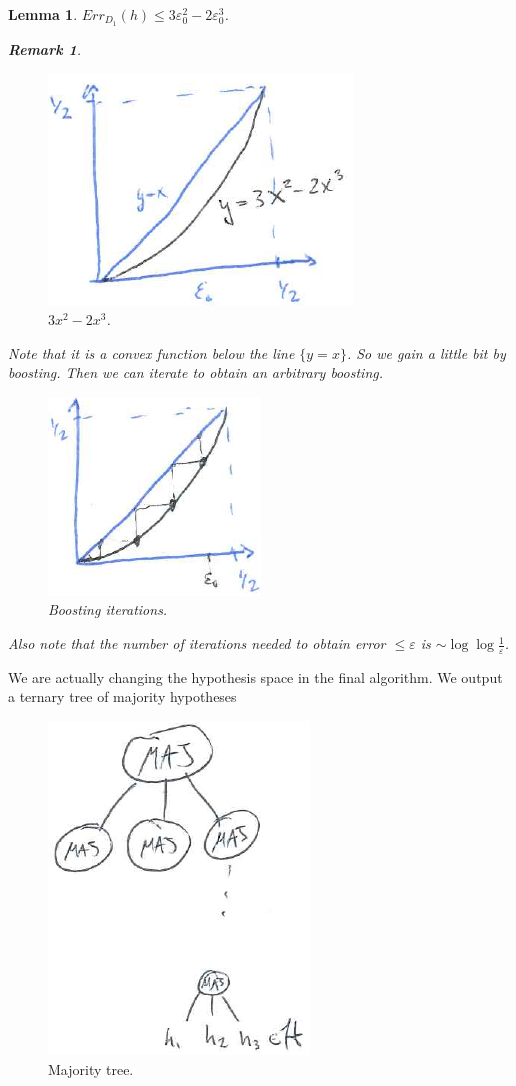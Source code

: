 \documentclass[12pt, letterpaper]{article}
\numberwithin{equation}{section} %
\newcommand{\ve}{\varepsilon}
\newtheorem{lemma}[theorem]{Lemma}
\newtheorem{remark}[theorem]{Remark}
\theoremstyle{definition}
\theoremstyle{remark}
\begin{document}
\begin{lemma}
$Err_{D_1}(h) \leq 3\ve_0^2 - 2\ve_0^3$.
\begin{remark}
\begin{figure}[H]
\centering
\includegraphics[width=0.3\linewidth]{../img/boosting-bound.png}
\caption{$3x^2 - 2x^3$.}
\end{figure}
Note that it is a convex function below the line $\lbrace y = x\rbrace$. So we gain a little bit by boosting. Then we can iterate to obtain an arbitrary boosting.
\begin{figure}[H]
\centering
\includegraphics[width=0.3\linewidth]{../img/boosting-iteration.png}
\caption{Boosting iterations.}
\end{figure}
Also note that the number of iterations needed to obtain error $\leq \ve$ is $\sim \log\log\frac1\ve$.
\end{remark}
\end{lemma}

We are actually changing the hypothesis space in the final algorithm. We output a ternary tree of majority hypotheses
\begin{figure}[H]
\centering
\includegraphics[width=0.3\linewidth]{../img/majority-tree.png}
\caption{Majority tree.}
\end{figure}
\end{document}
